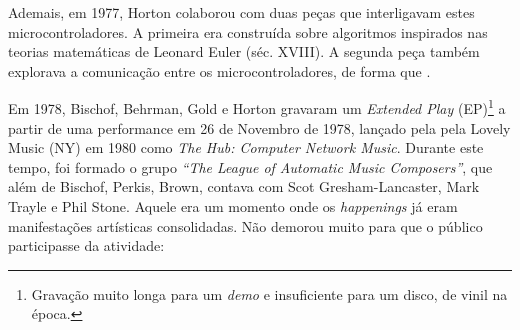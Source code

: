 Ademais, em 1977, Horton colaborou com duas peças que interligavam estes microcontroladores. A primeira era construída sobre algoritmos inspirados nas teorias matemáticas de Leonard Euler (séc. XVIII). A segunda peça também explorava a comunicação entre os microcontroladores, de forma que .

Em 1978, Bischof, Behrman, Gold e Horton gravaram um \emph{Extended Play} (EP)\footnote{Gravação muito longa para um \emph{demo} e insuficiente para um disco, de vinil na época.} a partir de uma performance em 26 de Novembro de 1978, lançado pela pela Lovely Music (NY) em 1980 como \emph{The Hub: Computer Network Music}. Durante este tempo, foi formado o grupo \emph{``The League of Automatic Music Composers''}, que além de  Bischof, Perkis, Brown, contava com Scot Gresham-Lancaster, Mark Trayle e Phil Stone. Aquele era um momento onde os \emph{happenings} já eram manifestações artísticas consolidadas. Não demorou muito para que o público participasse da atividade:

